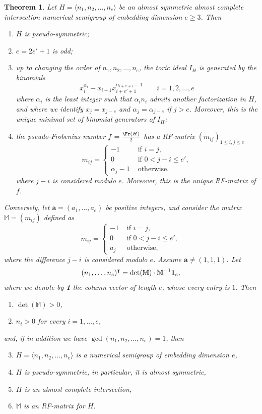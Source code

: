 \documentclass[11pt,twoside]{amsart}
\def\ba{{\mathbf a}}
\def\bbM{{\mathbb M}}
\def\al{\alpha}
\newtheorem{mainthm}{Theorem}
\theoremstyle{definition}
\numberwithin{equation}{section}
\begin{document}
\begin{mainthm}\label{mainTh} Let $H=\langle n_1, n_2, \ldots, n_e\rangle$ be  an almost symmetric almost complete intersection numerical semigroup of embedding dimension  $e\ge 3$.
Then 
\begin{enumerate}
\item $H$ is  pseudo-symmetric;
\item $e=2e'+1$ is odd;
\item up to changing the order of $ n_1, n_2, \ldots, n_e$,
the toric ideal 
$I_H$ is generated by the binomials
\[
x_i^{\al_i} - x_{i+1}{x_{i+e'+1}^{\al_{i+e'+1}-1}} \qquad  i = 1,2 ,\ldots, e \]
where
$\al_i$ is the least integer such that $\alpha_i n_i$ admits another factorization in $H$,
and where we identify $x_j = x_{j-e}$ and $\al_j =\al_{j-e}$ if $j> e$.
Moreover, this is the unique minimal set of binomial generators of $I_H$;

\item the pseudo-Frobenius number $f=\frac{\Fr(H)}{2}$ has a RF-matrix
$ (m_{ij})_{1\le i, j \le e}$ 
\[ m_{ij} = \left\{
\begin{array}{ll}
-1 & \text{ if  } i=j, \\
0  &  \text{ if }  0 < j-i \le e', \\
\al_j-1 & \text{ otherwise}. 
\end{array}
\right. 
\]
where  $j-i$ is considered modulo $e$.  
Moreover, this is the unique RF-matrix of $f$.
\end{enumerate}
Conversely, let $\ba = (a_1, \ldots , a_e)$ be positive integers, and consider the matrix  $\bbM = (m_{ij})$ defined as
\[ m_{ij} = \left\{
\begin{array}{ll}
-1 & \text{ if  } i=j, \\
0  &  \text{ if }  0 < j-i \le e', \\
a_j & \text{ otherwise}, 
\end{array}
\right.  \]
where the difference $j-i$ is  considered modulo $e$.
Assume $\ba \ne(1,1,1)$.
Let  
\[(n_1, \ldots , n_e)^\intercal = \det(\bbM) \cdot \bbM^{-1}{\bf 1}_e,\]
 where we denote by {\bf 1} the column vector of length $e$, 
whose every entry is $1$.
Then
\begin{enumerate}
    \item $\det(\bbM)>0$,
\item $n_i > 0$ for every $i=1,\ldots,e$,
\end{enumerate}
and,  if in addition we have $\gcd(n_1, n_2, \ldots, n_e)=1$, then
\begin{enumerate}
\setcounter{enumi}{2}
\item $H = \langle n_1, n_2, \ldots, n_e \rangle$
is a  numerical semigroup of embedding dimension $e$,
\item $H$ is pseudo-symmetric, in particular, it is almost symmetric,
\item $H$ is an almost complete intersection,
\item $\bbM$ is an RF-matrix for $H$.
\end{enumerate}
\end{mainthm}
\end{document}
